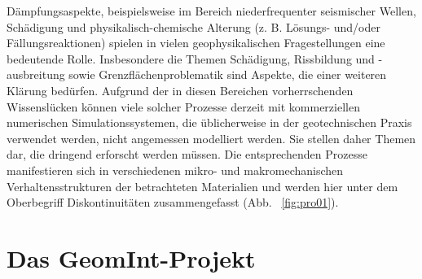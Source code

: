 Dämpfungsaspekte, beispielsweise im Bereich niederfrequenter seismischer Wellen, Schädigung und physikalisch-chemische Alterung (z. B. Lösungs- und/oder Fällungsreaktionen) spielen in vielen geophysikalischen Fragestellungen eine bedeutende Rolle. Insbesondere die Themen Schädigung, Rissbildung und -ausbreitung sowie Grenzflächenproblematik sind Aspekte, die einer weiteren Klärung bedürfen.  Aufgrund der in diesen Bereichen vorherrschenden Wissenslücken können viele solcher Prozesse derzeit mit kommerziellen numerischen Simulationssystemen, die üblicherweise in der geotechnischen Praxis verwendet werden, nicht angemessen modelliert werden. Sie stellen daher Themen dar, die dringend erforscht werden müssen. Die entsprechenden Prozesse manifestieren sich in verschiedenen mikro- und makromechanischen Verhaltensstrukturen der betrachteten Materialien und werden hier unter dem Oberbegriff Diskontinuitäten zusammengefasst (Abb. ~\ref{fig:pro01}).


\section*{Das GeomInt-Projekt}
\label{sec:geomint-de}

